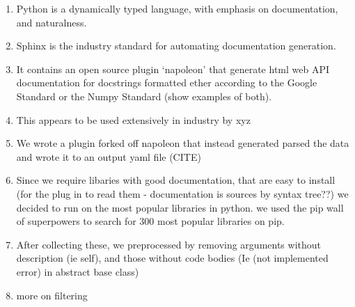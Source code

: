 \begin{enumerate}
    \item Python is a dynamically typed language, with emphasis on documentation, and naturalness.
    \item Sphinx is the industry standard for automating documentation generation.
    \item It contains an open source plugin `napoleon' that generate html web API documentation for docstrings formatted ether according to the Google Standard or the Numpy Standard (show examples of both).
    \item This appears to be used extensively in industry by xyz
    \item We wrote a plugin forked off napoleon that instead generated parsed the data and wrote it to an output yaml file (CITE)
    \item Since we require libaries with good documentation, that are easy to install (for the plug in to read them - documentation is sources by syntax tree??) we decided to run on the most popular libraries in python. we used the pip wall of superpowers to search for 300 most popular libraries on pip.
    \item After collecting these, we preprocessed by removing arguments without description (ie self), and those without code bodies (Ie (not implemented error) in abstract base class)
    \item more on filtering
\end{enumerate}




